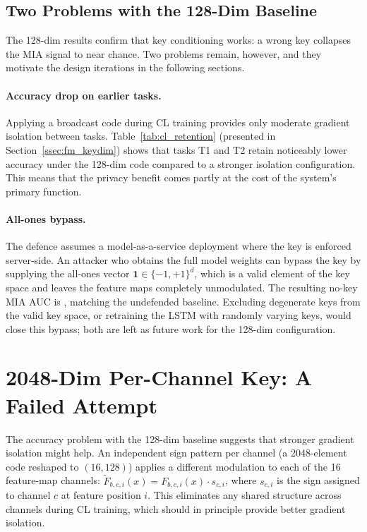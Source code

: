 \subsection{Two Problems with the 128-Dim Baseline}
\label{ssec:fm_limits}

The 128-dim results confirm that key conditioning works: a wrong key collapses the MIA signal to near chance. Two problems remain, however, and they motivate the design iterations in the following sections.

\paragraph{Accuracy drop on earlier tasks.}
Applying a broadcast code during CL training provides only moderate gradient isolation between tasks. Table~\ref{tab:cl_retention} (presented in Section~\ref{ssec:fm_keydim}) shows that tasks T1 and T2 retain noticeably lower accuracy under the 128-dim code compared to a stronger isolation configuration. This means that the privacy benefit comes partly at the cost of the system's primary function.

\paragraph{All-ones bypass.}
The defence assumes a model-as-a-service deployment where the key is enforced server-side. An attacker who obtains the full model weights can bypass the key by supplying the all-ones vector $\mathbf{1} \in \{-1,+1\}^d$, which is a valid element of the key space and leaves the feature maps completely unmodulated. The resulting no-key MIA AUC is \fmMIANoKey{}, matching the undefended baseline. Excluding degenerate keys from the valid key space, or retraining the LSTM with randomly varying keys, would close this bypass; both are left as future work for the 128-dim configuration.


\section{2048-Dim Per-Channel Key: A Failed Attempt}
\label{sec:cl_2048}

The accuracy problem with the 128-dim baseline suggests that stronger gradient isolation might help. An independent sign pattern per channel (a 2048-element code reshaped to $(16, 128)$) applies a different modulation to each of the 16 feature-map channels: $\tilde{F}_{b,c,i}(x) = F_{b,c,i}(x) \cdot s_{c,i}$, where $s_{c,i}$ is the sign assigned to channel $c$ at feature position $i$. This eliminates any shared structure across channels during CL training, which should in principle provide better gradient isolation.

